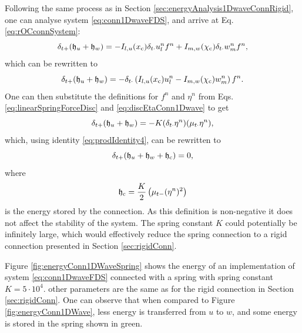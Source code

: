 Following the same process as in Section \ref{sec:energyAnalysis1DwaveConnRigid}, one can analyse system \eqref{eq:conn1DwaveFDS}, and arrive at Eq. \eqref{eq:rOCconnSystem}:
\begin{equation*}
    \delta_{t+} (\mathfrak{h}_u + \mathfrak{h}_w) = -I_{l, u}(x_{\text{c}}) \delta_{t\cdot} u_l^n f^n + I_{m, w}(\chi_{\text{c}}) \delta_{t\cdot} w_m^n f^n,
\end{equation*}
which can be rewritten to
\begin{equation*}
    \delta_{t+} (\mathfrak{h}_u + \mathfrak{h}_w) = -\delta_{t\cdot}\left(I_{l, u}(x_{\text{c}}) u_l^n - I_{m, w}(\chi_{\text{c}}) w_m^n\right)f^n.
\end{equation*}
One can then substitute the definitions for $f^n$ and $\eta^n$ from Eqs. \eqref{eq:linearSpringForceDisc} and \eqref{eq:discEtaConn1Dwave} to get
\begin{equation}\label{eq:energyAfterForceSubstitution}
    \delta_{t+} (\mathfrak{h}_u + \mathfrak{h}_w) = -K(\delta_{t\cdot} \eta^n) (\mu_{t\cdot} \eta^n),
\end{equation}
which, using identity \eqref{eq:prodIdentity4}, can be rewritten to
\begin{equation}
    \delta_{t+} (\mathfrak{h}_u + \mathfrak{h}_w + \mathfrak{h}_{\text{c}}) = 0,
\end{equation}
where
\begin{equation}
    \mathfrak{h}_{\text{c}} = \frac{K}{2}\left(\mu_{t-}(\eta^n)^2\right)
\end{equation}
is the energy stored by the connection. As this definition is non-negative it does not affect the stability of the system. The spring constant $K$ could potentially be infinitely large, which would effectively reduce the spring connection to a rigid connection presented in Section \ref{sec:rigidConn}.

Figure \ref{fig:energyConn1DWaveSpring} shows the energy of an implementation of system \eqref{eq:conn1DwaveFDS} connected with a spring with spring constant $K=5\cdot 10^4$. other parameters are the same as for the rigid connection in Section \ref{sec:rigidConn}. One can observe that when compared to Figure \ref{fig:energyConn1DWave}, less energy is transferred from $u$ to $w$, and some energy is stored in the spring shown in green. 


